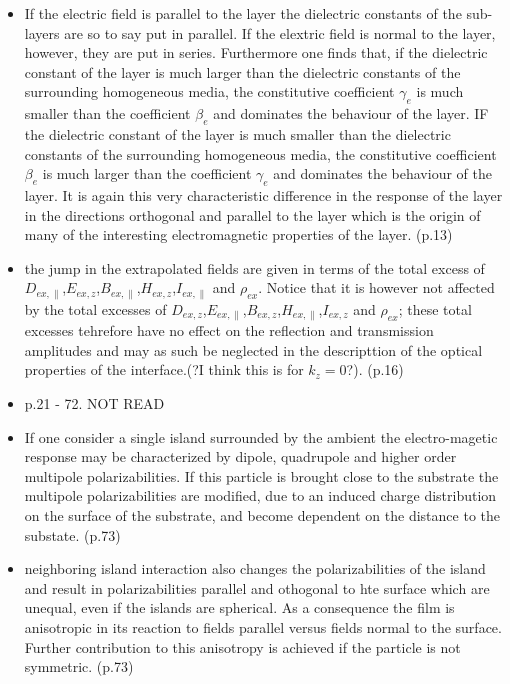\begin{itemize}
   \item If the electric field is parallel to the layer the dielectric constants of the sub-layers are so
   to say put in parallel. If the elextric field is normal to the layer, however, they are put in series.
   Furthermore one finds that, if the dielectric constant of the layer is much larger than the dielectric
   constants of the surrounding homogeneous media, the constitutive coefficient $\gamma_e$ is much smaller 
   than the coefficient $\beta_e$ and dominates the behaviour of the layer. IF the dielectric constant
   of the layer is much smaller than the dielectric constants of the surrounding homogeneous media,
   the constitutive coefficient $\beta_e$ is much larger than the coefficient $\gamma_e$ and dominates the
   behaviour of the layer. It is again this very characteristic difference in the response of the layer
   in the directions orthogonal and parallel to the layer which is the origin of many of the
   interesting electromagnetic properties of the layer. (p.13)

\item the jump in the extrapolated fields are given in terms of the total excess of 
$D_{ex,\parallel}$,$E_{ex,z}$,$B_{ex,\parallel}$,$H_{ex,z}$,$I_{ex,\parallel}$ and $\rho_{ex}$.
Notice that it is however not affected by the total excesses of
$D_{ex,z}$,$E_{ex,\parallel}$,$B_{ex,z}$,$H_{ex,\parallel}$,$I_{ex,z}$ and $\rho_{ex}$;
these total excesses tehrefore have no effect on the reflection and transmission
amplitudes and may as such be neglected in the descripttion of the optical properties of the 
interface.(?I think this is for $k_z = 0$?). (p.16)

\item p.21 - 72. NOT READ

\item If one consider a single island surrounded by the ambient the electro-magetic response may be
characterized by dipole, quadrupole and higher order multipole polarizabilities. If this particle
is brought close to the substrate the multipole polarizabilities are modified, due to an 
induced charge distribution on the surface of the substrate, and become dependent on the distance to
the substate. (p.73)
\item neighboring island interaction also changes the polarizabilities of the island and result in 
polarizabilities parallel and othogonal to hte surface which are unequal, even if the islands are spherical.
As a consequence the film is anisotropic in its reaction to fields parallel versus fields normal to the 
surface. Further contribution to this anisotropy is achieved if the particle is not symmetric.
(p.73)


\end{itemize}

